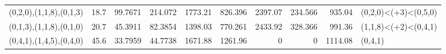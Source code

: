 \begin{tabular}{lrrrrrrrrl}
 (0,2,0),(1,1,8),(0,1,3)  &       18.7 &                           99.7671 &                        214.072  &                          1773.21  &                         826.396 &                           2397.07 &                         234.566 &     935.04 & (0,2,0)<(+3)<(0,5,0)  \\
 (0,1,3),(1,1,8),(0,1,0)  &       20.7 &                           45.3911 &                         82.3854 &                          1398.03  &                         770.261 &                           2433.92 &                         328.366 &     991.36 & (1,1,8)<(+2)<(0,4,1)  \\
 (0,4,1),(1,4,5),(0,4,0)  &       45.6 &                           33.7959 &                         44.7738 &                          1671.88  &                        1261.96  &                              0    &                           0     &    1114.08 & (0,4,1)               \\
\hline
\end{tabular}